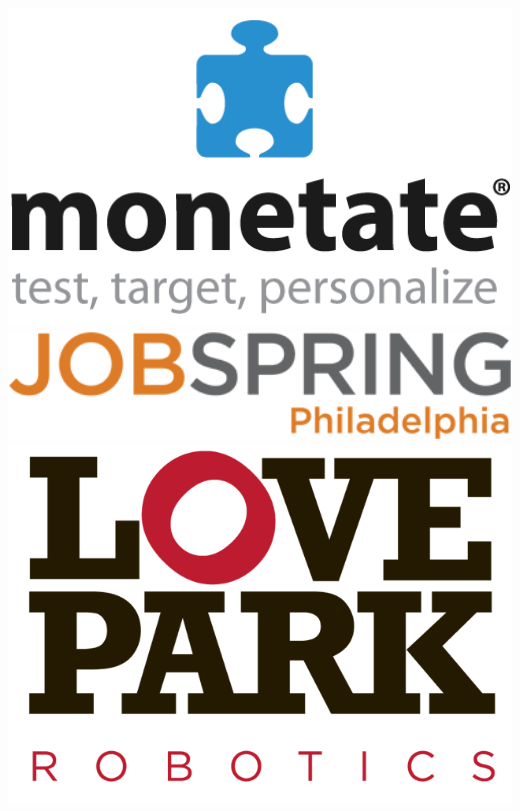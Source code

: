 \documentclass[xcolor=dvipsnames,red]{beamer}
\begin{document}
\begin{frame}
\begin{columns}
\begin{column}{.33\textwidth}
\includegraphics[width=1\textwidth]{imgs/monetate.png}\\
\vspace{.5 cm}
\includegraphics[width=1\textwidth]{imgs/jobspring.png}\\
\vspace{.5 cm}
\includegraphics[width=1\textwidth]{imgs/love_park_robotics.png}
\end{column}


\end{columns}
\end{frame}
\end{document}
